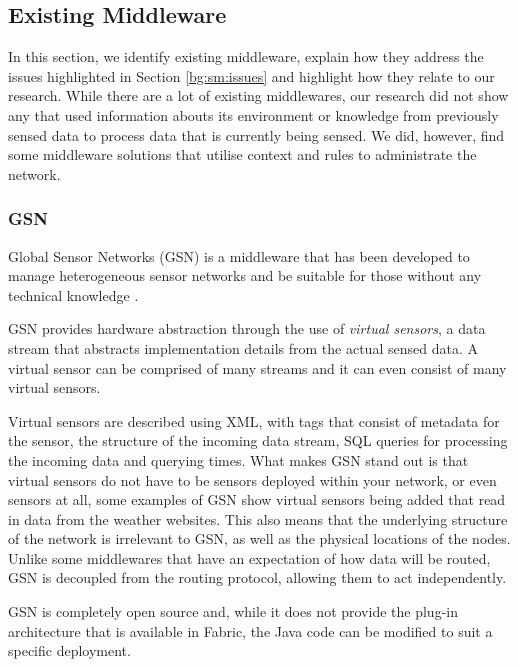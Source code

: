 \subsection{Existing Middleware}\label{sec:middleware}
	In this section, we identify existing middleware, explain how they address the issues highlighted in Section \ref{bg:sm:issues} and highlight how they relate to our research. While there are a lot of existing middlewares, our research did not show any that used information abouts its environment or knowledge from previously sensed data to process data that is currently being sensed. We did, however, find some middleware solutions that utilise context and rules to administrate the network.

	\subsubsection{GSN}\label{sec:GSN}
		Global Sensor Networks (GSN) is a middleware that has been developed to manage heterogeneous sensor networks and be suitable for those without any technical knowledge \cite{F2006}.

GSN provides hardware abstraction through the use of  \textit{virtual sensors}, a data stream that abstracts implementation details from the actual sensed data. A virtual sensor can be comprised of many streams and it can even consist of many virtual sensors. 

Virtual sensors are described using XML, with tags that consist of metadata for the sensor, the structure of the incoming data stream, SQL queries for processing the incoming data and querying times. What makes GSN stand out is that virtual sensors do not have to be sensors deployed within your network, or even sensors at all, some examples of GSN show virtual sensors being added that read in data from the weather websites. This also means that the underlying structure of the network is irrelevant to GSN, as well as the physical locations of the nodes. Unlike some middlewares that have an expectation of how data will be routed, GSN is decoupled from the routing protocol, allowing them to act independently.

GSN is completely open source and, while it does not provide the plug-in architecture that is available in Fabric, the Java code can be modified to suit a specific deployment. 

